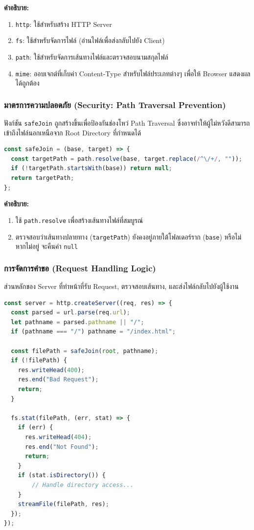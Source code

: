 \textbf{คำอธิบาย:}
\begin{enumerate}
    \item \texttt{http}: ใช้สำหรับสร้าง HTTP Server
    \item \texttt{fs}: ใช้สำหรับจัดการไฟล์ (อ่านไฟล์เพื่อส่งกลับไปยัง Client)
    \item \texttt{path}: ใช้สำหรับจัดการเส้นทางไฟล์และตรวจสอบนามสกุลไฟล์
    \item \texttt{mime}: ออบเจกต์ที่เก็บค่า Content-Type สำหรับไฟล์ประเภทต่างๆ เพื่อให้ Browser แสดงผลได้ถูกต้อง
\end{enumerate}

\subsubsection{มาตรการความปลอดภัย (Security: Path Traversal Prevention)}
ฟังก์ชัน \texttt{safeJoin} ถูกสร้างขึ้นเพื่อป้องกันช่องโหว่ Path Traversal ซึ่งอาจทำให้ผู้ไม่หวังดีสามารถเข้าถึงไฟล์นอกเหนือจาก Root Directory ที่กำหนดได้

\begin{lstlisting}[language=JavaScript, caption={ฟังก์ชัน safeJoin ป้องกัน Path Traversal}, label={code:frontend-index-safejoin}]
const safeJoin = (base, target) => {
  const targetPath = path.resolve(base, target.replace(/^\/+/, ""));
  if (!targetPath.startsWith(base)) return null;
  return targetPath;
};
\end{lstlisting}

\textbf{คำอธิบาย:}
\begin{enumerate}
    \item ใช้ \texttt{path.resolve} เพื่อสร้างเส้นทางไฟล์ที่สมบูรณ์
    \item ตรวจสอบว่าเส้นทางปลายทาง (\texttt{targetPath}) ยังคงอยู่ภายใต้โฟลเดอร์ราก (\texttt{base}) หรือไม่ หากไม่อยู่ จะคืนค่า \texttt{null}
\end{enumerate}

\subsubsection{การจัดการคำขอ (Request Handling Logic)}
ส่วนหลักของ Server ที่ทำหน้าที่รับ Request, ตรวจสอบเส้นทาง, และส่งไฟล์กลับไปยังผู้ใช้งาน

\begin{lstlisting}[language=JavaScript, caption={Logic การจัดการ Request}, label={code:frontend-index-handler}]
const server = http.createServer((req, res) => {
  const parsed = url.parse(req.url);
  let pathname = parsed.pathname || "/";
  if (pathname === "/") pathname = "/index.html";
  
  const filePath = safeJoin(root, pathname);
  if (!filePath) {
    res.writeHead(400);
    res.end("Bad Request");
    return;
  }
  
  fs.stat(filePath, (err, stat) => {
    if (err) {
      res.writeHead(404);
      res.end("Not Found");
      return;
    }
    if (stat.isDirectory()) {
        // Handle directory access...
    }
    streamFile(filePath, res);
  });
});
\end{lstlisting}

